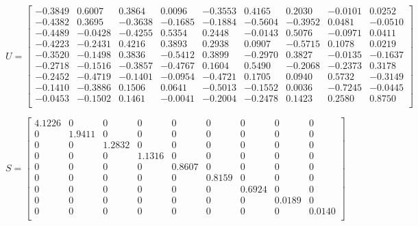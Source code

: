 \documentclass{article}
\begin{document}
$U = \begin{bmatrix}
    -0.3849 &  0.6007 &  0.3864 &  0.0096 & -0.3553 &  0.4165 &  0.2030 & -0.0101 &  0.0252 \\ 
    -0.4382 &  0.3695 & -0.3638 & -0.1685 & -0.1884 & -0.5604 & -0.3952 &  0.0481 & -0.0510 \\ 
    -0.4489 & -0.0428 & -0.4255 &  0.5354 &  0.2448 & -0.0143 &  0.5076 & -0.0971 &  0.0411 \\ 
    -0.4223 & -0.2431 &  0.4216 &  0.3893 &  0.2938 &  0.0907 & -0.5715 &  0.1078 &  0.0219 \\ 
    -0.3520 & -0.1498 &  0.3836 & -0.5412 &  0.3899 & -0.2970 &  0.3827 & -0.0135 & -0.1637 \\ 
    -0.2718 & -0.1516 & -0.3857 & -0.4767 &  0.1604 &  0.5490 & -0.2068 & -0.2373 &  0.3178 \\ 
    -0.2452 & -0.4719 & -0.1401 & -0.0954 & -0.4721 &  0.1705 &  0.0940 &  0.5732 & -0.3149 \\ 
    -0.1410 & -0.3886 &  0.1506 &  0.0641 & -0.5013 & -0.1552 &  0.0036 & -0.7245 & -0.0445 \\ 
    -0.0453 & -0.1502 &  0.1461 & -0.0041 & -0.2004 & -0.2478 &  0.1423 &  0.2580 &  0.8750 \\
    \end{bmatrix}$
    
$S = \begin{bmatrix}
     4.1226 &       0 &       0 &       0 &       0 &       0 &       0 &       0 &       0 \\ 
          0 &  1.9411 &       0 &       0 &       0 &       0 &       0 &       0 &       0 \\ 
          0 &       0 &  1.2832 &       0 &       0 &       0 &       0 &       0 &       0 \\ 
          0 &       0 &       0 &  1.1316 &       0 &       0 &       0 &       0 &       0 \\ 
          0 &       0 &       0 &       0 &  0.8607 &       0 &       0 &       0 &       0 \\ 
          0 &       0 &       0 &       0 &       0 &  0.8159 &       0 &       0 &       0 \\ 
          0 &       0 &       0 &       0 &       0 &       0 &  0.6924 &       0 &       0 \\ 
          0 &       0 &       0 &       0 &       0 &       0 &       0 &  0.0189 &       0 \\ 
          0 &       0 &       0 &       0 &       0 &       0 &       0 &       0 &  0.0140 \\ 
    \end{bmatrix}$
    
\end{document}
